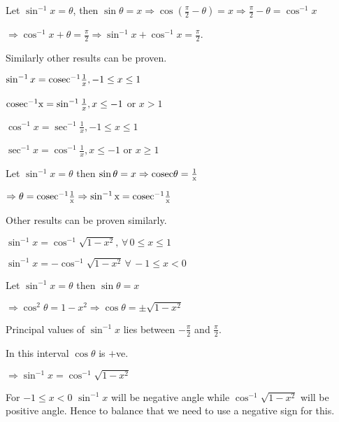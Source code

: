 \startproof
  Let $\sin^{-1}x = \theta$, then $\sin\theta = x \Rightarrow \cos\left(\frac{\pi}{2} - \theta\right) = x \Rightarrow \frac{\pi}{2}
  - \theta = \cos^{-1}x$

  $\Rightarrow \cos^{-1}x + \theta = \frac{\pi}{2} \Rightarrow \sin^{-1}x + \cos^{-1}x = \frac{\pi}{2}$.

  Similarly other results can be proven.
\stopproof

\starttheorem
  \startitemize[n]
  \item $\sin^{-1}x = {\rm cosec}^{-1}\frac{1}{x}, -1\leq x\leq 1$
  \item ${\rm cosec^{-1}x} = \sin^{-1}\frac{1}{x}, x\leq -1$ or $x > 1$
  \item $\cos^{-1}x = \sec^{-1}\frac{1}{x}, -1\leq x\leq 1$
  \item $\sec^{-1}x = \cos^{-1}\frac{1}{x}, x\leq -1$ or $x\geq 1$
  \stopitemize
\stoptheorem

\startproof
  Let $\sin^{-1}x = \theta$ then $\sin\theta = x \Rightarrow \rm cosec\theta = \frac{1}{x}$

  $\Rightarrow \theta = \rm cosec^{-1}\frac{1}{x} \Rightarrow \sin^{-1}x = \rm cosec^{-1}\frac{1}{x}$

  Other results can be proven similarly.
\stopproof

\starttheorem
  \startitemize[n]
    \item $\sin^{-1}x = \cos^{-1}\sqrt{1 - x^2}, \,\forall\,0\leq x\leq 1$

    \item $\sin^{-1}x = -\cos^{-1}\sqrt{1 - x^2}\,\forall\,-1\leq x< 0$
  \stopitemize
\stoptheorem

\startproof
  Let $\sin^{-1}x = \theta$ then $\sin\theta = x$

  $\Rightarrow \cos^2\theta = 1 - x^2 \Rightarrow \cos\theta = \pm\sqrt{1 - x^2}$

  Principal values of $\sin^{-1}x$ lies between $-\frac{\pi}{2}$ and $\frac{\pi}{2}$.

  In this interval $\cos\theta$ is $+$ve.

  $\Rightarrow \sin^{-1}x = \cos^{-1}\sqrt{1 - x^2}$

  For $-1\leq x < 0$ $\sin^{-1}x$ will be negative angle while $\cos^{-1}\sqrt{1 - x^2}$ will be positive
  angle. Hence to balance that we need to use a negative sign for this.
\stopproof